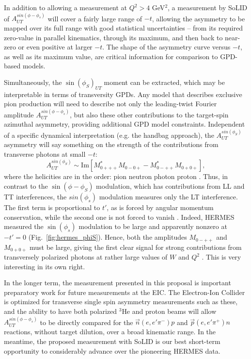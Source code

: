 In addition to allowing a measurement at $Q^2>4$ GeV$^2$, a measurement by
SoLID of $A_{UT}^{sin(\phi-\phi_s)}$ will cover a fairly large range of $-t$,
allowing the asymmetry to be mapped over its full range with good statistical
uncertainties -- from its required zero-value in parallel kinematics, through
its maximum, and then back to near-zero or even positive at larger $-t$.  
The shape of the asymmetry curve versus
$-t$, as well as its maximum value, are critical information for comparison to
GPD-based models.

Simultaneously, the $\sin(\phi_S)_{UT}$ moment can be extracted, which may be
interpretable in terms of transversity GPDs.  Any model that describes
exclusive pion production will need to describe not only the leading-twist
Fourier amplitude $A_{UT}^{sin(\phi-\phi_s)}$, but also these other
contributions to the target-spin azimuthal asymmetry, providing additional GPD
model constraints.  Independent of a specific dynamical interpretation
(e.g. the handbag approach), the $A_{UT}^{sin(\phi_S)}$ asymmetry will say
something on the strength of the contributions from transverse photons at
small $-t$:
\begin{equation}
A_{UT}^{sin(\phi_S)}\sim\mathrm{Im}[M^*_{0+++}M_{0-0+} - M^*_{0-++}M_{0+0+}],
\end{equation}
where the helicities are in the order: pion neutron photon proton
\cite{Go10}.  Thus, in contrast to the $\sin(\phi-\phi_S)$ modulation, which
has contributions from LL and TT interferences, the $sin(\phi_s)$ modulation
measures only the LT interference.  The first term is proportional to $t'$, as
is forced by angular momentum conservation, while the second one is not forced
to vanish \cite{GoPC}.  Indeed, HERMES measured the $\sin(\phi_s)$ modulation
to be large and apparently nonzero at $-t'=0$ (Fig.~\ref{fig:hermes_phiS}).
Hence, both the amplitudes $M_{0-++}$ and $M_{0+0+}$ must be large, giving the
first clear signal for strong contributions from transversely polarized photons
at rather large values of $W$ and $Q^2$ \cite{Go10}.  This is very interesting
in its own right.


In the longer term, the measurement presented in this proposal is important
preparatory work for future measurements at the EIC.  The Electron-Ion Collider
is optimized for transverse single spin asymmetry measurements such as these,
and the ability to have both polarized $^3$He and proton beams will allow
$A_{UT}^{sin(\phi-\phi_s)}$ to be directly compared for the
$\vec{n}(e,e'\pi^-)p$ and $\vec{p}(e,e'\pi^+)n$ reactions, without target
dilution, over a broad kinematic range.  In the meantime, the proposed
measurement with SoLID is our best short-term opportunity to considerably
advance over the pioneering HERMES data.

